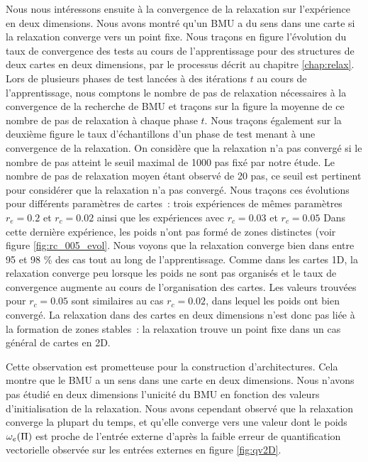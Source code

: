 \documentclass[../main]{subfiles}
\begin{document}
Nous nous intéressons ensuite à la convergence de la relaxation sur l'expérience en deux dimensions. Nous avons montré qu'un BMU a du sens dans une carte si la relaxation converge vers un point fixe.
Nous traçons en figure \label{fig:relax} l'évolution du taux de convergence des tests au cours de l'apprentissage pour des structures de deux cartes en deux dimensions, par le
processus décrit au chapitre \ref{chap:relax}. Lors de plusieurs phases de test lancées à des itérations $t$ au cours de l'apprentissage, nous comptons le nombre de pas de relaxation nécessaires à la convergence de la recherche de BMU et traçons sur la figure la moyenne de ce nombre de pas de relaxation à chaque phase $t$. 
Nous traçons également sur la deuxième figure le taux d'échantillons d'un phase de test menant à une convergence de la relaxation. On considère que la relaxation n'a pas convergé si le nombre de pas atteint le seuil maximal de 1000 pas fixé par notre étude. Le nombre de pas de relaxation moyen étant observé de 20 pas, ce seuil est pertinent pour considérer que la relaxation n'a pas convergé.
Nous traçons ces évolutions pour différents paramètres de cartes~: trois expériences de mêmes paramètres $r_e=0.2$ et $r_c = 0.02$ ainsi que les expériences avec $r_c = 0.03$ et $r_c = 0.05$ Dans cette dernière expérience, les poids n'ont pas formé de zones distinctes (voir figure \ref{fig:rc_005_evol}.
Nous voyons que la relaxation converge bien dans entre 95 et 98 \% des cas tout au long de l'apprentissage. Comme dans les cartes 1D, la relaxation converge peu lorsque les poids ne sont pas organisés et le taux de convergence augmente au cours de l'organisation des cartes.
Les valeurs trouvées pour $r_c = 0.05$ sont similaires au cas $r_c = 0.02$, dans lequel les poids ont bien convergé. La relaxation dans des cartes en deux dimensions n'est donc pas liée à la formation de zones stables~: la relaxation trouve un point fixe dans un cas général de cartes en 2D.

Cette observation est prometteuse pour la construction d'architectures. Cela montre que le BMU a un sens dans une carte en deux dimensions.
Nous n'avons pas étudié en deux dimensions l'unicité du BMU en fonction des valeurs d'initialisation de la relaxation.  Nous avons cependant observé que la relaxation converge la plupart du temps, et qu'elle converge vers une valeur dont le poids $\omega_e(\Pi)$ est proche de l'entrée externe d'après la faible erreur de quantification vectorielle observée sur les entrées externes en figure \ref{fig:qv2D}.
\end{document}
